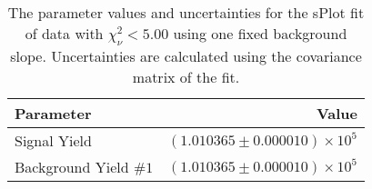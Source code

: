 
\begin{table}[h]
    \begin{center}
        \begin{tabular}{lr}\toprule
            Parameter & Value \\\midrule
            Signal Yield & $(1.010365 \pm 0.000010) \times 10^{5}$ \\
            Background Yield $\#1$ & $(1.010365 \pm 0.000010) \times 10^{5}$ \\\bottomrule
        \end{tabular}
        \caption{The parameter values and uncertainties for the sPlot fit of data with $\chi^2_\nu < 5.00$ using one fixed background slope. Uncertainties are calculated using the covariance matrix of the fit.}
    \end{center}
\end{table}
